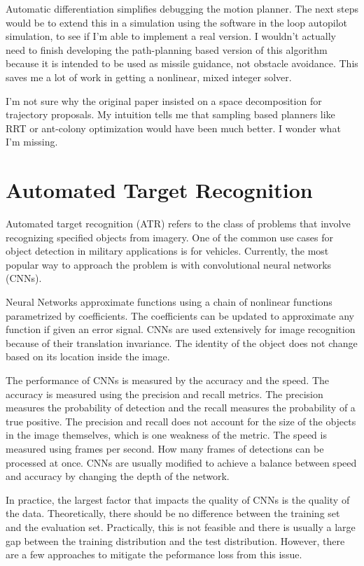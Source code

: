 \documentclass[12pt]{article}
\begin{document}
Automatic differentiation simplifies debugging the motion planner. The next steps would be to extend this in a simulation using the software in the loop autopilot simulation, to see if I'm able to implement a real version. I wouldn't actually need to finish developing the path-planning based version of this algorithm because it is intended to be used as missile guidance, not obstacle avoidance. This saves me a lot of work in getting a nonlinear, mixed integer solver. 

I'm not sure why the original paper insisted on a space decomposition for trajectory proposals. My intuition tells me that sampling based planners like RRT or ant-colony optimization would have been much better. I wonder what I'm missing. 

\section{Automated Target Recognition}
Automated target recognition (ATR) refers to the class of problems that involve recognizing specified objects from imagery. One of the common use cases for object detection in military applications is for vehicles. Currently, the most popular way to approach the problem is with convolutional neural networks (CNNs).

Neural Networks approximate functions using a chain of nonlinear functions parametrized by coefficients. The coefficients can be updated to approximate any function if given an error signal. CNNs are used extensively for image recognition because of their translation invariance. The identity of the object does not change based on its location inside the image. 

The performance of CNNs is measured by the accuracy and the speed. The accuracy is measured using the precision and recall metrics. The precision measures the probability of detection and the recall measures the probability of a true positive. The precision and recall does not account for the size of the objects in the image themselves, which is one weakness of the metric. The speed is measured using frames per second. How many frames of detections can be processed at once. CNNs are usually modified to achieve a balance between speed and accuracy by changing the depth of the network.

In practice, the largest factor that impacts the quality of CNNs is the quality of the data. Theoretically, there should be no difference between the training set and the evaluation set. Practically, this is not feasible and there is usually a large gap between the training distribution and the test distribution. However, there are a few approaches to mitigate the peformance loss from this issue.
\end{document}
